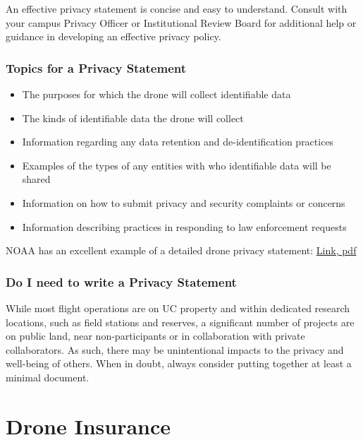 \documentclass[
  12pt,
]{book}
\providecommand{\tightlist}{%
  \setlength{\itemsep}{0pt}\setlength{\parskip}{0pt}}
\begin{document}
An effective privacy statement is concise and easy to understand. Consult with your campus Privacy Officer or Institutional Review Board for additional help or guidance in developing an effective privacy policy.

\subsection{Topics for a Privacy Statement}\label{topics-for-a-privacy-statement}

\begin{itemize}
\tightlist
\item
  The purposes for which the drone will collect identifiable data
\item
  The kinds of identifiable data the drone will collect
\item
  Information regarding any data retention and de-identification practices
\item
  Examples of the types of any entities with who identifiable data will be shared
\item
  Information on how to submit privacy and security complaints or concerns
\item
  Information describing practices in responding to law enforcement requests
\end{itemize}

NOAA has an excellent example of a detailed drone privacy statement: \hyperref[https:ux2fux2fwww.cio.noaa.govux2fitmanagementux2fpdfsux2fSigned_UAS_PrivacyPolicy.pdf]{Link, pdf}

\subsection{Do I need to write a Privacy Statement}\label{do-i-need-to-write-a-privacy-statement}

While most flight operations are on UC property and within dedicated research locations, such as field stations and reserves, a significant number of projects are on public land, near non-participants or in collaboration with private collaborators. As such, there may be unintentional impacts to the privacy and well-being of others. When in doubt, always consider putting together at least a minimal document.

\chapter{Drone Insurance}\label{insurance}
\end{document}
